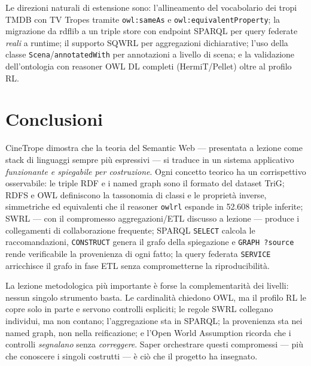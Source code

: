 \documentclass[a4paper,11pt]{article}
\newcommand{\code}[1]{\texttt{#1}}
\begin{document}
Le direzioni naturali di estensione sono: l'allineamento del vocabolario
dei tropi TMDB con TV Tropes tramite \code{owl:sameAs} e
\code{owl:equivalentProperty}; la migrazione da rdflib a un triple store
con endpoint SPARQL per query federate \emph{reali} a runtime; il supporto
SQWRL per aggregazioni dichiarative; l'uso della classe
\code{Scena}/\code{annotatedWith} per annotazioni a livello di scena; e la
validazione dell'ontologia con reasoner OWL DL completi (HermiT/Pellet)
oltre al profilo RL.

\section{Conclusioni}

CineTrope dimostra che la teoria del Semantic Web --- presentata a lezione
come stack di linguaggi sempre pi\`u espressivi --- si traduce in un
sistema applicativo \emph{funzionante e spiegabile per costruzione}. Ogni
concetto teorico ha un corrispettivo osservabile: le triple RDF e i named
graph sono il formato del dataset TriG; RDFS e OWL definiscono la
tassonomia di classi e le propriet\`a inverse, simmetriche ed equivalenti
che il reasoner \code{owlrl} espande in 52.608 triple inferite; SWRL ---
con il compromesso aggregazioni/ETL discusso a lezione --- produce i
collegamenti di collaborazione frequente; SPARQL \code{SELECT} calcola le
raccomandazioni, \code{CONSTRUCT} genera il grafo della spiegazione e
\code{GRAPH ?source} rende verificabile la provenienza di ogni fatto; la
query federata \code{SERVICE} arricchisce il grafo in fase ETL senza
comprometterne la riproducibilit\`a.

La lezione metodologica pi\`u importante \`e forse la complementarit\`a dei
livelli: nessun singolo strumento basta. Le cardinalit\`a chiedono OWL, ma
il profilo RL le copre solo in parte e servono controlli espliciti; le
regole SWRL collegano individui, ma non contano; l'aggregazione sta in
SPARQL; la provenienza sta nei named graph, non nella reificazione; e
l'Open World Assumption ricorda che i controlli \emph{segnalano} senza
\emph{correggere}. Saper orchestrare questi compromessi --- pi\`u che
conoscere i singoli costrutti --- \`e ci\`o che il progetto ha insegnato.
\end{document}
